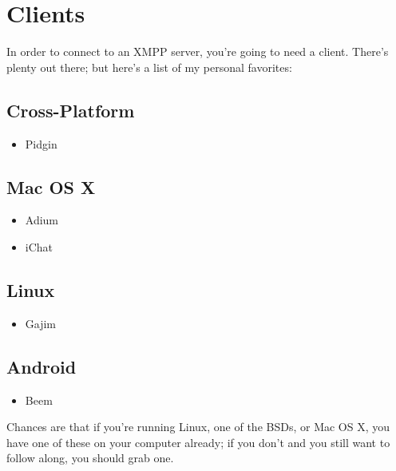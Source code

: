 \section{Clients}

\pause

In order to connect to an XMPP server, you're going to need a client.  There's plenty out there;
but here's a list of my personal favorites:

\pause
\subsection*{Cross-Platform}

\begin{itemize}
\item Pidgin
\end{itemize}

\pause
\subsection*{Mac OS X}

\begin{itemize}
\item Adium
\item iChat
\end{itemize}

\pause
\subsection*{Linux}

\begin{itemize}
\item Gajim
\end{itemize}

\pause
\subsection*{Android}

\begin{itemize}
\item Beem
\end{itemize}

\newpage
Chances are that if you're running Linux, one of the BSDs, or Mac OS X, you have one of these on your computer already;
if you don't and you still want to follow along, you should grab one.
